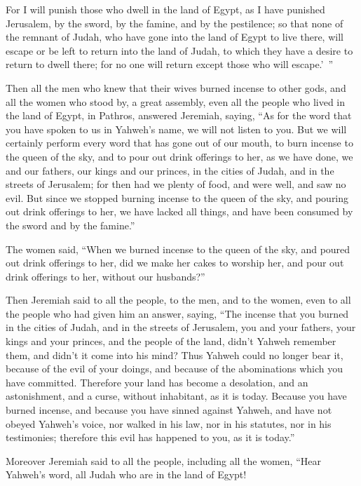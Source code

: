 {For I will punish those who dwell in the land of Egypt, as I have punished Jerusalem, by the sword, by the famine, and by the pestilence;
so that none of the remnant of Judah, who have gone into the land of Egypt to live there, will escape or be left to return into the land of Judah, to which they have a desire to return to dwell there; for no one will return except those who will escape.’ ”
\par }{\PP {}Then all the men who knew that their wives burned incense to other gods, and all the women who stood by, a great assembly, even all the people who lived in the land of Egypt, in Pathros, answered Jeremiah, saying,
“As for the word that you have spoken to us in Yahweh’s name, we will not listen to you.
But we will certainly perform every word that has gone out of our mouth, to burn incense to the queen of the sky, and to pour out drink offerings to her, as we have done, we and our fathers, our kings and our princes, in the cities of Judah, and in the streets of Jerusalem; for then had we plenty of food, and were well, and saw no evil.
But since we stopped burning incense to the queen of the sky, and pouring out drink offerings to her, we have lacked all things, and have been consumed by the sword and by the famine.”
\par }{\PP {}The women said, “When we burned incense to the queen of the sky, and poured out drink offerings to her, did we make her cakes to worship her, and pour out drink offerings to her, without our husbands?”
\par }{\PP {}Then Jeremiah said to all the people, to the men, and to the women, even to all the people who had given him an answer, saying,
“The incense that you burned in the cities of Judah, and in the streets of Jerusalem, you and your fathers, your kings and your princes, and the people of the land, didn’t Yahweh remember them, and didn’t it come into his mind?
Thus Yahweh could no longer bear it, because of the evil of your doings, and because of the abominations which you have committed. Therefore your land has become a desolation, and an astonishment, and a curse, without inhabitant, as it is today.
Because you have burned incense, and because you have sinned against Yahweh, and have not obeyed Yahweh’s voice, nor walked in his law, nor in his statutes, nor in his testimonies; therefore this evil has happened to you, as it is today.”
\par }{\PP {}Moreover Jeremiah said to all the people, including all the women, “Hear Yahweh’s word, all Judah who are in the land of Egypt!
}

